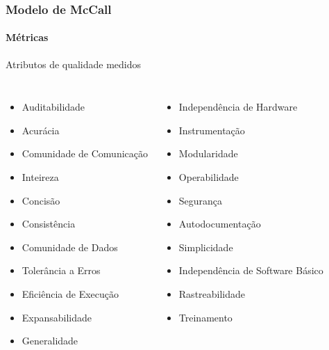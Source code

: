 \begin{frame}
	\frametitle{Modelo de McCall}
	\framesubtitle{Métricas}

	\begin{block:fact}{Atributos de qualidade medidos}
		\begin{columns}
			\begin{itemize}
				\item Auditabilidade
				\item Acurácia
				\item Comunidade de Comunicação
				\item Inteireza
				\item Concisão
				\item Consistência
				\item Comunidade de Dados
				\item Tolerância a Erros
				\item Eficiência de Execução
				\item Expansabilidade
				\item Generalidade
			\end{itemize}
			
			\begin{itemize}
				\item Independência de Hardware
				\item Instrumentação
				\item Modularidade
				\item Operabilidade
				\item Segurança
				\item Autodocumentação
				\item Simplicidade
				\item Independência de Software Básico
				\item Rastreabilidade
				\item Treinamento
			\end{itemize}
		\end{columns}
	\end{block:fact}
	

\end{frame}
